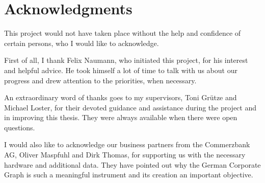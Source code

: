 \section*{Acknowledgments}
This project would not have taken place without the help and confidence of certain persons, who I would like to acknowledge.

First of all, I thank Felix Naumann, who initiated this project, for his interest and helpful advice. He took himself a lot of time to talk with us about our progress and drew attention to the priorities, when necessary.

An extraordinary word of thanks goes to my supervisors, Toni Grütze and Michael Loster, for their devoted guidance and assistance during the project and in improving this thesis. They were always available when there were open questions.

I would also like to acknowledge our business partners from the Commerzbank AG, Oliver Maspfuhl and Dirk Thomas, for supporting us with the necessary hardware and additional data. They have pointed out why the German Corporate Graph is such a meaningful instrument and its creation an important objective.